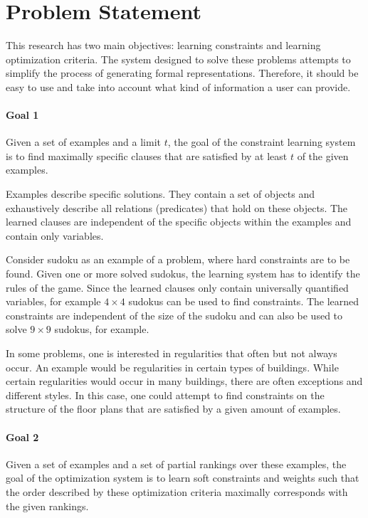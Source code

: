 \documentclass{llncs}
\begin{document}
\section{Problem Statement}
This research has two main objectives: learning constraints and learning optimization criteria.
The system designed to solve these problems attempts to simplify the process of generating formal representations.
Therefore, it should be easy to use and take into account what kind of information a user can provide.

\begin{framed}
  \noindent
  \begin{minipage}{\textwidth}
    \paragraph*{Goal 1}
    Given a set of examples and a limit $t$, the goal of the constraint learning system is to find maximally specific clauses that are satisfied by at least $t$ of the given examples.
  \end{minipage}
\end{framed}

Examples describe specific solutions.
They contain a set of objects and exhaustively describe all relations (predicates) that hold on these objects.
The learned clauses are independent of the specific objects within the examples and contain only variables.

\begin{example}
  Consider sudoku as an example of a problem, where hard constraints are to be found.
  Given one or more solved sudokus, the learning system has to identify the rules of the game.
  Since the learned clauses only contain universally quantified variables, for example $4 \times 4$ sudokus can be used to find constraints.
  The learned constraints are independent of the size of the sudoku and can also be used to solve $9 \times 9$ sudokus, for example.

  In some problems, one is interested in regularities that  often but not always occur.
  An example would be regularities in certain types of buildings.
  While certain regularities would occur in many buildings, there are often exceptions and different styles.
  In this case, one could attempt to find constraints on the structure of the floor plans that are satisfied by a given amount of examples.
\end{example}

\begin{framed}
  \noindent
  \begin{minipage}{\textwidth}
    \paragraph*{Goal 2}
    Given a set of examples and a set of partial rankings over these examples, the goal of the optimization system is to learn soft constraints and weights such that the order described by these optimization criteria maximally corresponds with the given rankings.
  \end{minipage}
\end{framed}
\end{document}
